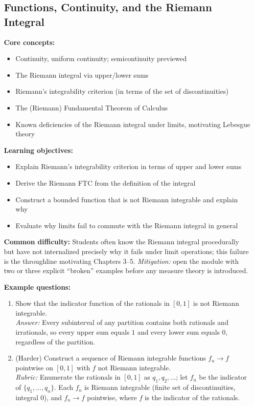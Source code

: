 \documentclass[11pt]{article}
\begin{document}
\subsection{Functions, Continuity, and the Riemann Integral}

\textbf{Core concepts:}
\begin{itemize}[nosep]
\item Continuity, uniform continuity; semicontinuity previewed
\item The Riemann integral via upper/lower sums
\item Riemann's integrability criterion (in terms of the set of discontinuities)
\item The (Riemann) Fundamental Theorem of Calculus
\item Known deficiencies of the Riemann integral under limits, motivating Lebesgue theory
\end{itemize}

\textbf{Learning objectives:}
\begin{itemize}[nosep]
\item Explain Riemann's integrability criterion in terms of upper and lower sums
\item Derive the Riemann FTC from the definition of the integral
\item Construct a bounded function that is not Riemann integrable and explain why
\item Evaluate why limits fail to commute with the Riemann integral in general
\end{itemize}

\textbf{Common difficulty:} Students often know the Riemann integral procedurally but have not internalized precisely why it fails under limit operations; this failure is the throughline motivating Chapters 3--5. \textit{Mitigation:} open the module with two or three explicit ``broken'' examples before any measure theory is introduced.

\textbf{Example questions:}
\begin{enumerate}[nosep]
\item Show that the indicator function of the rationals in $[0,1]$ is not Riemann integrable. \\
\textit{Answer:} Every subinterval of any partition contains both rationals and irrationals, so every upper sum equals $1$ and every lower sum equals $0$, regardless of the partition.
\item (Harder) Construct a sequence of Riemann integrable functions $f_n\to f$ pointwise on $[0,1]$ with $f$ not Riemann integrable. \\
\textit{Rubric:} Enumerate the rationals in $[0,1]$ as $q_1,q_2,\dots$; let $f_n$ be the indicator of $\{q_1,\dots,q_n\}$. Each $f_n$ is Riemann integrable (finite set of discontinuities, integral $0$), and $f_n\to f$ pointwise, where $f$ is the indicator of the rationals.
\end{enumerate}
\end{document}
